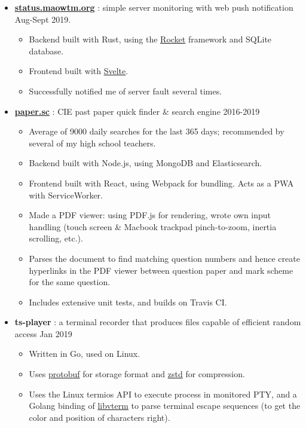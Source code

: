 \documentclass[a4paper]{article}
\begin{document}
  \begin{itemize}

    \item \href{https://status.maowtm.org}{\color{link}\textbf{status.maowtm.org}} : simple server monitoring with web push notification \dashdiv{} Aug-Sept 2019.

    \begin{itemize}
      \item Backend built with Rust, using the \href{https://rocket.rs}{\color{link}Rocket} framework and SQLite database.
      \item Frontend built with \href{https://svelte.dev/}{\color{link}Svelte}.
      \item Successfully notified me of server fault several times.
    \end{itemize}

    \item \href{https://paper.sc}{\color{link}\textbf{paper.sc}} : CIE past paper quick finder \& search engine \dashdiv{} 2016-2019

    \begin{itemize}
      \item Average of \texttildelow{}9000 daily searches for the last 365 days; recommended by several of my high school teachers.
      \item Backend built with Node.js, using MongoDB and Elasticsearch.
      \item Frontend built with React, using Webpack for bundling. Acts as a PWA with ServiceWorker.
      \item Made a PDF viewer: using PDF.js for rendering, wrote own input handling (touch screen \& Macbook trackpad pinch-to-zoom, inertia scrolling, etc.).
      \item Parses the document to find matching question numbers and hence create hyperlinks in the PDF viewer between question paper and mark scheme for the same question.
      \item Includes extensive unit tests, and builds on Travis CI.
    \end{itemize}

    \item \textbf{ts-player} : a terminal recorder that produces files capable of efficient random access \dashdiv{} Jan 2019

    \begin{itemize}
      \item Written in Go, used on Linux.
      \item Uses \href{https://developers.google.com/protocol-buffers}{\color{link}protobuf} for storage format and \href{https://facebook.github.io/zstd/}{\color{link}zstd} for compression.
      \item Uses the Linux termios API to execute process in monitored PTY, and a Golang binding of \href{http://www.leonerd.org.uk/code/libvterm/}{\color{link}libvterm} to parse terminal escape sequences (to get the color and position of characters right).
    \end{itemize}


\end{itemize}
\end{document}
